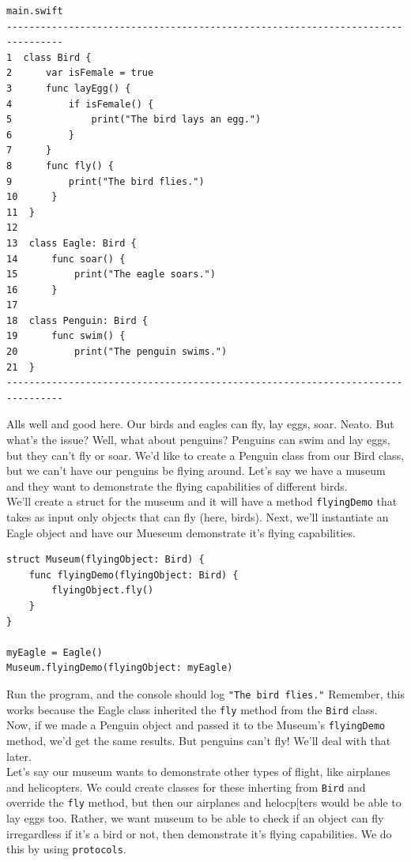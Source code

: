 \documentclass[11pt, letterpaper]{article}
\begin{document}
\begin{verbatim}
main.swift
--------------------------------------------------------------------------------
1  class Bird {
2      var isFemale = true
3      func layEgg() {
4          if isFemale() {
5              print("The bird lays an egg.")
6          }
7      }
8      func fly() {
9          print("The bird flies.")
10      }
11  }
12
13  class Eagle: Bird {
14      func soar() {
15          print("The eagle soars.")
16      }
17
18  class Penguin: Bird {
19      func swim() {
20          print("The penguin swims.")
21  }
--------------------------------------------------------------------------------
\end{verbatim}

Alls well and good here. Our birds and eagles can fly, lay eggs, soar. Neato. But what's the issue? Well, what about 
penguins? Penguins can swim and lay eggs, but they can't fly or soar. We'd like to create a Penguin class from our Bird
class, but we can't have our penguins be flying around. Let's say we have a museum and they want to demonstrate 
the flying capabilities of different birds. \\

We'll create a struct for the museum and it will have a method 
\verb+flyingDemo+ that takes as input only objects that can fly (here, birds). Next, we'll instantiate an Eagle object
and have our Mueseum demonstrate it's flying capabilities.

\begin{verbatim}
struct Museum(flyingObject: Bird) {
    func flyingDemo(flyingObject: Bird) {
        flyingObject.fly()
    }
}

myEagle = Eagle()
Museum.flyingDemo(flyingObject: myEagle)
\end{verbatim}

Run the program, and the console should log \verb+"The bird flies."+ Remember, this works because the Eagle class
inherited the \verb+fly+ method from the \verb+Bird+ class. Now, if we made a Penguin object and passed it to
tbe Museum's \verb+flyingDemo+ method, we'd get the same results. But penguins can't fly! We'll deal with that later. \\

Let's say our museum wants to demonstrate other types of flight, like airplanes and helicopters. We could create
classes for these inherting from \verb+Bird+ and override the \verb+fly+ method, but then our airplanes and helocp[ters
would be able to lay eggs too. Rather, we want museum to be able to check if an object can fly irregardless if it's
a bird or not, then demonstrate it's flying capabilities. We do this by using \verb+protocols+. \\
\end{document}
